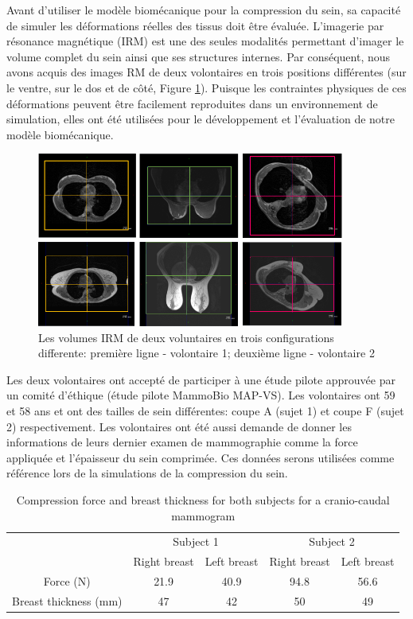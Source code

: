 Avant d'utiliser le modèle biomécanique pour la compression du sein, sa capacité de simuler les déformations réelles des tissus doit être évaluée. L'imagerie par résonance magnétique (IRM) est une des seules modalités permettant d'imager le volume complet du sein ainsi que ses structures internes. Par conséquent, nous avons acquis des images RM de deux volontaires en trois positions différentes (sur le ventre, sur le dos et de côté,  Figure \ref{fig:donneespatient}).  Puisque les contraintes physiques de ces déformations peuvent être facilement reproduites dans un environnement de simulation, elles ont été utilisées pour le développement et l'évaluation de notre modèle biomécanique.     

\begin{figure}[!h]
\centering
\includegraphics[width=0.9\textwidth,keepaspectratio]{figures/patientData.png} 
\caption{Les volumes IRM de deux voluntaires en trois configurations differente: première ligne - volontaire 1; deuxième ligne - volontaire 2}\label{fig:donneespatient}
\end{figure}


Les deux volontaires ont accepté de participer à une étude pilote approuvée par un comité d'éthique (étude pilote MammoBio MAP-VS). Les volontaires ont 59 et 58 ans et ont des tailles de sein différentes: coupe A (sujet 1) et coupe F (sujet 2) respectivement. Les volontaires ont été aussi demande de donner les informations de leurs dernier examen de mammographie comme la force appliquée et l'épaisseur du sein comprimée. Ces données serons utilisées comme référence lors de la simulations de la compression du sein. 
\begin{table}[!h]
\centering
\begin{tabular}{c|c|c||c|c|}
\cline{2-5}
&\multicolumn{2}{c||}{Subject 1}&\multicolumn{2}{c|}{Subject 2}\\
\cline{2-5}
& Right breast & Left breast & Right breast & Left breast\\
\cline{2-5}
\hline
\multicolumn{1}{|c||}{Force (N)}  & 21.9 &40.9 &94.8 & 56.6 \\
\hline
\multicolumn{1}{|c||}{ Breast thickness (mm)} & 47 & 42 & 50 & 49 \\
\hline

\end{tabular}
\caption{Compression force and breast thickness for both subjects for a cranio-caudal mammogram}\label{tab:forceandthichnessdata}
\end{table}

